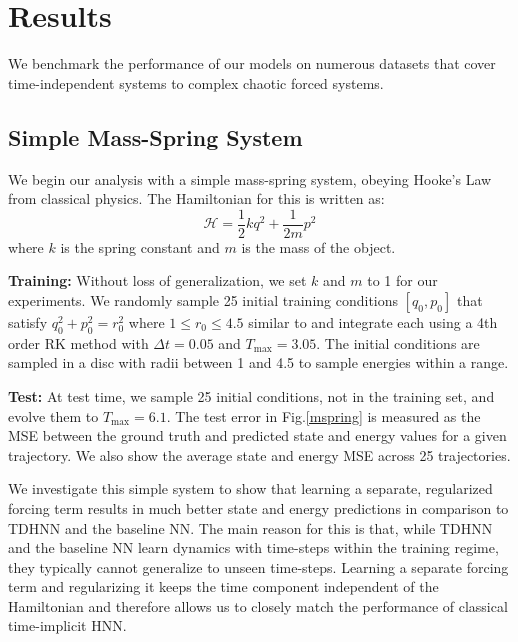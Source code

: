\documentclass[twoside]{article}
\begin{document}
\section{Results}

We benchmark the performance of our models on numerous datasets that cover time-independent systems to complex chaotic forced systems. 

\subsection{Simple Mass-Spring System}

We begin our analysis with a simple mass-spring system, obeying Hooke's Law from classical physics. The Hamiltonian for this is written as:
\begin{equation}
\mathcal{H} = \frac{1}{2}kq^2 + \frac{1}{2m}p^2 
\end{equation}
where $k$ is the spring constant and $m$ is the mass of the object. 

\textbf{Training:} Without loss of generalization, we set $k$ and $m$ to 1 for our experiments. We randomly sample 25 initial training conditions $[q_0,p_0]$ that satisfy $q_0^2+p_0^2 = r_0^2$ where $1 \leq r_0 \leq 4.5$ similar to \cite{greydanus_hamiltonian_2019} and integrate each using a 4th order RK method with $\Delta t =0.05$ and $T_{\max} = 3.05$. The initial conditions are sampled in a disc with radii between 1 and 4.5 to sample energies within a range.

\textbf{Test:} At test time, we sample 25 initial conditions, not in the training set, and evolve them to $T_{\max}=6.1$. The test error in Fig.\ref{mspring} is measured as the MSE between the ground truth and predicted state and energy values for a given trajectory. We also show the average state and energy MSE across 25 trajectories. 

We investigate this simple system to show that learning a separate, regularized forcing term results in much better state and energy predictions in comparison to TDHNN and the baseline NN. The main reason for this is that, while TDHNN and the baseline NN learn dynamics with time-steps within the training regime, they typically cannot generalize to unseen time-steps. Learning a separate forcing term and regularizing it keeps the time component independent of the Hamiltonian and therefore allows us to closely match the performance of classical time-implicit HNN.
\end{document}
